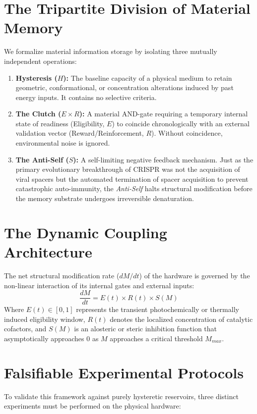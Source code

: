 \documentclass[11pt,a4paper]{article}
\begin{document}
\section{The Tripartite Division of Material Memory}
We formalize material information storage by isolating three mutually independent operations:
\begin{enumerate}
    \item \textbf{Hysteresis ($H$):} The baseline capacity of a physical medium to retain geometric, conformational, or concentration alterations induced by past energy inputs. It contains no selective criteria.
    \item \textbf{The Clutch ($E \times R$):} A material AND-gate requiring a temporary internal state of readiness (Eligibility, $E$) to coincide chronologically with an external validation vector (Reward/Reinforcement, $R$). Without coincidence, environmental noise is ignored.
    \item \textbf{The Anti-Self ($S$):} A self-limiting negative feedback mechanism. Just as the primary evolutionary breakthrough of CRISPR was not the acquisition of viral spacers but the automated termination of spacer acquisition to prevent catastrophic auto-immunity, the \textit{Anti-Self} halts structural modification before the memory substrate undergoes irreversible denaturation.
\end{enumerate}

\section{The Dynamic Coupling Architecture}
The net structural modification rate ($dM/dt$) of the hardware is governed by the non-linear interaction of its internal gates and external inputs:
\begin{equation}
\frac{dM}{dt} = E(t) \times R(t) \times S(M)
\end{equation}
Where $E(t) \in [0, 1]$ represents the transient photochemically or thermally induced eligibility window, $R(t)$ denotes the localized concentration of catalytic cofactors, and $S(M)$ is an alosteric or steric inhibition function that asymptotically approaches 0 as $M$ approaches a critical threshold $M_{max}$.

\section{Falsifiable Experimental Protocols}
To validate this framework against purely hysteretic reservoirs, three distinct experiments must be performed on the physical hardware:
\end{document}
